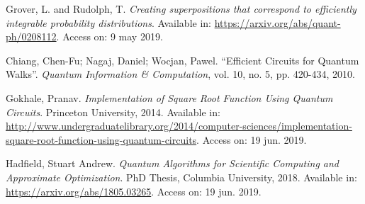 \documentclass[a4paper, 10pt]{article}
\numberwithin{equation}{section}
\numberwithin{figure}{section}
\numberwithin{table}{section}
\begin{document}
\begin{thebibliography}{10}
 Grover, L. and Rudolph, T. \textit{Creating superpositions that correspond to efficiently integrable probability distributions}. Available in: \url{https://arxiv.org/abs/quant-ph/0208112}. Access on: 9 may 2019.

 Chiang, Chen-Fu; Nagaj, Daniel; Wocjan, Pawel. ``Efficient Circuits for Quantum Walks''. \textit{Quantum Information \& Computation}, vol. 10, no. 5, pp. 420-434, 2010.

 Gokhale, Pranav. \textit{Implementation of Square Root Function Using Quantum Circuits}. Princeton University, 2014. Available in: \url{http://www.undergraduatelibrary.org/2014/computer-sciences/implementation-square-root-function-using-quantum-circuits}. Access on: 19 jun. 2019.

 Hadfield, Stuart Andrew. \textit{Quantum Algorithms for Scientific Computing and Approximate Optimization}. PhD Thesis, Columbia University, 2018. Available in: \url{https://arxiv.org/abs/1805.03265}. Access on: 19 jun. 2019.

\end{thebibliography}
\end{document}
